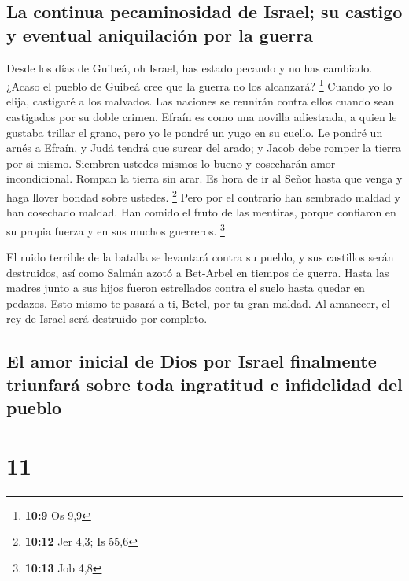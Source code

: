 \hypertarget{la-continua-pecaminosidad-de-israel-su-castigo-y-eventual-aniquilaciuxf3n-por-la-guerra}{%
\subsection{La continua pecaminosidad de Israel; su castigo y eventual
aniquilación por la
guerra}\label{la-continua-pecaminosidad-de-israel-su-castigo-y-eventual-aniquilaciuxf3n-por-la-guerra}}

 Desde los días de Guibeá, oh Israel, has estado pecando y
no has cambiado. ¿Acaso el pueblo de Guibeá cree que la guerra no los
alcanzará? \footnote{\textbf{10:9} Os 9,9}  Cuando yo lo
elija, castigaré a los malvados. Las naciones se reunirán contra ellos
cuando sean castigados por su doble crimen.  Efraín es
como una novilla adiestrada, a quien le gustaba trillar el grano, pero
yo le pondré un yugo en su cuello. Le pondré un arnés a Efraín, y Judá
tendrá que surcar del arado; y Jacob debe romper la tierra por si mismo.
 Siembren ustedes mismos lo bueno y cosecharán amor
incondicional. Rompan la tierra sin arar. Es hora de ir al Señor hasta
que venga y haga llover bondad sobre ustedes. \footnote{\textbf{10:12}
  Jer 4,3; Is 55,6}  Pero por el contrario han sembrado
maldad y han cosechado maldad. Han comido el fruto de las mentiras,
porque confiaron en su propia fuerza y en sus muchos guerreros.
\footnote{\textbf{10:13} Job 4,8}

 El ruido terrible de la batalla se levantará contra su
pueblo, y sus castillos serán destruidos, así como Salmán azotó a
Bet-Arbel en tiempos de guerra. Hasta las madres junto a sus hijos
fueron estrellados contra el suelo hasta quedar en pedazos.
 Esto mismo te pasará a ti, Betel, por tu gran maldad. Al
amanecer, el rey de Israel será destruido por completo.

\hypertarget{el-amor-inicial-de-dios-por-israel-finalmente-triunfaruxe1-sobre-toda-ingratitud-e-infidelidad-del-pueblo}{%
\subsection{El amor inicial de Dios por Israel finalmente triunfará
sobre toda ingratitud e infidelidad del
pueblo}\label{el-amor-inicial-de-dios-por-israel-finalmente-triunfaruxe1-sobre-toda-ingratitud-e-infidelidad-del-pueblo}}

\hypertarget{section-10}{%
\section{11}\label{section-10}}

